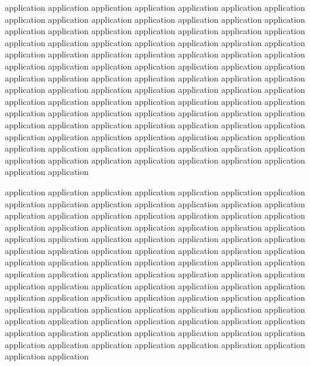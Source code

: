 \documentclass[platex,ja=standard,12pt,a4paper,twoside,onecolumn,fleqn,dvipdfmx,english]{bxjsbook}
\begin{document}
application application application application application application application application application application application application application application application application application application application application application application application application application application application application application application application application application application application application application application application application application application application application application application application application application application application application application application application application application application application application application application application application application application application application application application application application application application application application application application application application application application application application application application application application application application application application application application application application application application application application

application application application application application application application application application application application application application application application application application application application application application application application application application application application application application application application application application application application application application application application application application application application application application application application application application application application application application application application application application application application application application application application application application application application application application application application application application application application application application application application application application application application application application application application application application application application application application application application application application application application application
\end{document}

